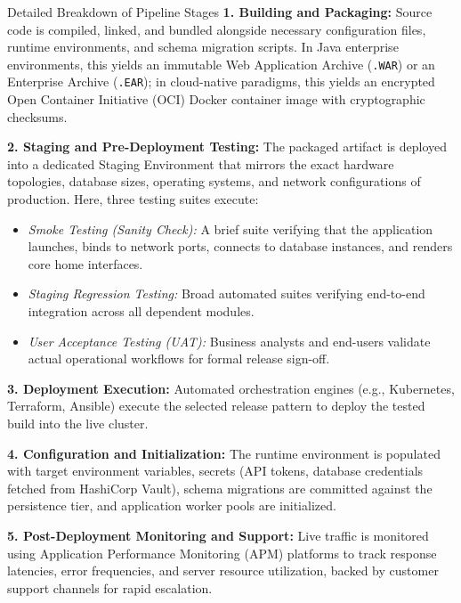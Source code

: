 \documentclass[11pt,a4paper]{article}
\begin{document}
\begin{conceptcard}{Detailed Breakdown of Pipeline Stages}
\textbf{1. Building and Packaging:} Source code is compiled, linked, and bundled alongside necessary configuration files, runtime environments, and schema migration scripts. In Java enterprise environments, this yields an immutable Web Application Archive (\texttt{.WAR}) or an Enterprise Archive (\texttt{.EAR}); in cloud-native paradigms, this yields an encrypted Open Container Initiative (OCI) Docker container image with cryptographic checksums.

\textbf{2. Staging and Pre-Deployment Testing:} The packaged artifact is deployed into a dedicated Staging Environment that mirrors the exact hardware topologies, database sizes, operating systems, and network configurations of production. Here, three testing suites execute:
\begin{itemize}
    \item \textit{Smoke Testing (Sanity Check):} A brief suite verifying that the application launches, binds to network ports, connects to database instances, and renders core home interfaces.
    \item \textit{Staging Regression Testing:} Broad automated suites verifying end-to-end integration across all dependent modules.
    \item \textit{User Acceptance Testing (UAT):} Business analysts and end-users validate actual operational workflows for formal release sign-off.
\end{itemize}

\textbf{3. Deployment Execution:} Automated orchestration engines (e.g., Kubernetes, Terraform, Ansible) execute the selected release pattern to deploy the tested build into the live cluster.

\textbf{4. Configuration and Initialization:} The runtime environment is populated with target environment variables, secrets (API tokens, database credentials fetched from HashiCorp Vault), schema migrations are committed against the persistence tier, and application worker pools are initialized.

\textbf{5. Post-Deployment Monitoring and Support:} Live traffic is monitored using Application Performance Monitoring (APM) platforms to track response latencies, error frequencies, and server resource utilization, backed by customer support channels for rapid escalation.
\end{conceptcard}

\end{document}
